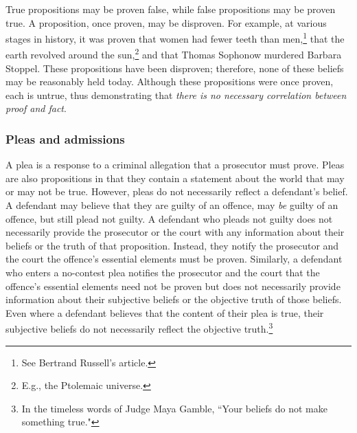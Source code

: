 True propositions may be proven false, while false propositions may be proven true. A proposition, once proven, may be disproven. For example, at various stages in history, it was proven that women had fewer teeth than men,\footnote{See Bertrand Russell's article.} that the earth revolved around the sun,\footnote{E.g., the Ptolemaic universe.} and that Thomas Sophonow murdered Barbara Stoppel. These propositions have been disproven; therefore, none of these beliefs may be reasonably held today. Although these propositions were once proven, each is untrue, thus demonstrating that \textit{there is no necessary correlation between proof and fact}.

\subsubsection{Pleas and admissions}

A plea is a response to a criminal allegation that a prosecutor must prove. Pleas are also propositions in that they contain a statement about the world that may or may not be true. However, pleas do not necessarily reflect a defendant's belief. A defendant may believe that they are guilty of an offence, may \textit{be} guilty of an offence, but still plead not guilty. A defendant who pleads not guilty does not necessarily provide the prosecutor or the court with any information about their beliefs or the truth of that proposition. Instead, they notify the prosecutor and the court the offence's essential elements must be proven. Similarly, a defendant who enters a no-contest plea notifies the prosecutor and the court that the offence's essential elements need not be proven but does not necessarily provide information about their subjective beliefs or the objective truth of those beliefs. Even where a defendant believes that the content of their plea is true, their subjective beliefs do not necessarily reflect the objective truth.\footnote{In the timeless words of Judge Maya Gamble, ``Your beliefs do not make something true."}

